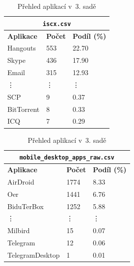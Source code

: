 \begin{table}[H]
	\centering
	\begin{minipage}{0.49\textwidth}
		\centering
		\begin{tabular}{lll}
			\toprule
			\multicolumn{3}{c}{\texttt{iscx.csv}} \\
			\midrule
			\textbf{Aplikace} & \textbf{Počet} & \textbf{Podíl (\%)} \\
			\midrule
			Hangouts          & 553             & 22.70                \\
			Skype             & 436             & 17.90                \\
			Email             & 315             & 12.93                \\
			\vdots            & \vdots          & \vdots               \\
			SCP               & 9               & 0.37                 \\
			BitTorrent        & 8               & 0.33                 \\
			ICQ               & 7               & 0.29                 \\
			\bottomrule
		\end{tabular}
		\caption{Přehled aplikací v~\texttt{iscx.csv}}
		\label{tab:apps-iscx}
	\end{minipage}
	\hfill
	\begin{minipage}{0.49\textwidth}
		\centering
		\begin{tabular}{lll}
			\toprule
			\multicolumn{3}{c}{\texttt{mobile\_desktop\_apps\_raw.csv}} \\
			\midrule
			\textbf{Aplikace} & \textbf{Počet} & \textbf{Podíl (\%)} \\
			\midrule
			AirDroid          & 1774            & 8.33                 \\
			Oer               & 1441            & 6.76                 \\
			BiduTerBox        & 1252            & 5.88                 \\
			\vdots            & \vdots          & \vdots               \\
			Milbird           & 15              & 0.07                 \\
			Telegram          & 12              & 0.06                 \\
			TelegramDesktop   & 1               & 0.01                 \\
			\bottomrule
		\end{tabular}
		\caption{Přehled aplikací v~3. sadě}
		\label{tab:apps-mobile}
	\end{minipage}
\end{table}


